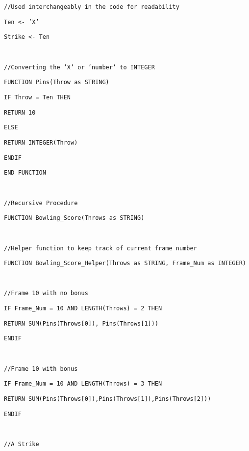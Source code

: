 \noindent %
\noindent\begin{minipage}[t]{1\columnwidth}%
\texttt{//Used interchangeably in the code for readability}

\texttt{Ten <- 'X'}

\texttt{Strike <- Ten}

\texttt{\bigskip{}
}

\texttt{//Converting the 'X' or 'number' to INTEGER }

\texttt{FUNCTION Pins(Throw as STRING)}

\texttt{\qquad{}IF Throw = Ten THEN}

\texttt{\qquad{}\qquad{}RETURN 10}

\texttt{\qquad{}ELSE}

\texttt{\qquad{}\qquad{}RETURN INTEGER(Throw)}

\texttt{\qquad{}ENDIF }

\texttt{END FUNCTION}

\texttt{\bigskip{}
}

\texttt{//Recursive Procedure }

\texttt{FUNCTION Bowling\_Score(Throws as STRING)}

\texttt{\bigskip{}
}

\texttt{\qquad{}//Helper function to keep track of current frame
number}

\texttt{\qquad{}FUNCTION Bowling\_Score\_Helper(Throws as STRING,
Frame\_Num as INTEGER) }

\texttt{\bigskip{}
}

\texttt{\qquad{}\qquad{}//Frame 10 with no bonus }

\texttt{\qquad{}\qquad{}IF Frame\_Num = 10 AND LENGTH(Throws) =
2 THEN }

\texttt{\qquad{}\qquad{}\qquad{}RETURN SUM(Pins(Throws{[}0{]}),
Pins(Throws{[}1{]})) }

\texttt{\qquad{}\qquad{}ENDIF}

\texttt{\bigskip{}
}

\texttt{\qquad{}\qquad{}//Frame 10 with bonus}

\texttt{\qquad{}\qquad{}IF Frame\_Num = 10 AND LENGTH(Throws) =
3 THEN}

\texttt{\qquad{}\qquad{}\qquad{}RETURN SUM(Pins(Throws{[}0{]}),Pins(Throws{[}1{]}),Pins(Throws{[}2{]})) }

\texttt{\qquad{}\qquad{}ENDIF}

\texttt{\bigskip{}
}

\texttt{\qquad{}\qquad{}//A Strike }


\end{minipage}
